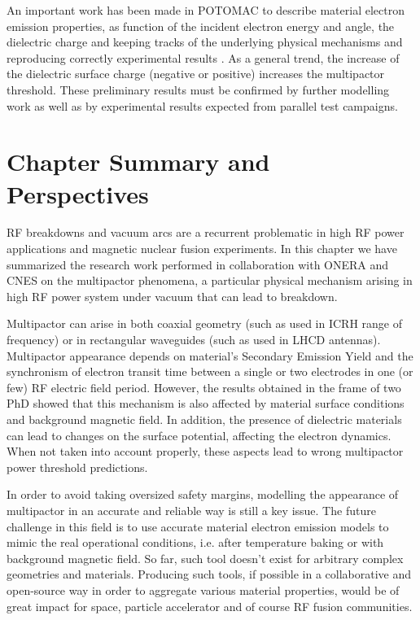 An important work has been made in POTOMAC to describe material electron emission properties, as function of the incident electron energy and angle, the dielectric charge and keeping tracks of the underlying physical mechanisms and reproducing correctly experimental results . As a general trend, the increase of the dielectric surface charge (negative or positive) increases the multipactor threshold. These preliminary results must be confirmed by further modelling work as well as by experimental results expected from parallel test campaigns.




\section{Chapter Summary and Perspectives}
RF breakdowns and vacuum arcs are a recurrent problematic in high RF power applications and magnetic nuclear fusion experiments. In this chapter we have summarized the research work performed in collaboration with ONERA and CNES on the multipactor phenomena, a particular physical mechanism arising in high RF power system under vacuum that can lead to breakdown. 

Multipactor can arise in both coaxial geometry (such as used in ICRH range of frequency) or in rectangular waveguides (such as used in LHCD antennas). Multipactor appearance depends on material's Secondary Emission Yield and the synchronism of electron transit time between a single or two electrodes in one (or few) RF electric field period. However, the results obtained in the frame of two PhD showed that this mechanism is also affected by material surface conditions and background magnetic field. In addition, the presence of dielectric materials can lead to changes on the surface potential, affecting the electron dynamics. When not taken into account properly, these aspects lead to wrong multipactor power threshold predictions.

In order to avoid taking oversized safety margins, modelling the appearance of multipactor in an accurate and reliable way is still a key issue. The future challenge in this field is to use accurate material electron emission models to mimic the real operational conditions, i.e. after temperature baking or with background magnetic field. So far, such tool doesn't exist for arbitrary complex geometries and materials. Producing such tools, if possible in a collaborative and open-source way in order to aggregate various material properties, would be of great impact for space, particle accelerator and of course RF fusion communities.